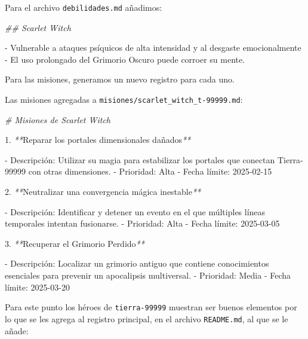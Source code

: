 \documentclass[
]{book}
\newenvironment{Shaded}{\begin{snugshade}}{\end{snugshade}}
\newcommand{\CommentTok}[1]{\textcolor[rgb]{0.56,0.35,0.01}{\textit{#1}}}
\newcommand{\ExtensionTok}[1]{#1}
\newcommand{\NormalTok}[1]{#1}
\newcommand{\PreprocessorTok}[1]{\textcolor[rgb]{0.56,0.35,0.01}{\textit{#1}}}
\begin{document}
Para el archivo \texttt{debilidades.md} añadimos:

\begin{Shaded}
\begin{Highlighting}[]

\CommentTok{\#\# Scarlet Witch}

\ExtensionTok{{-}}\NormalTok{ Vulnerable a ataques psíquicos de alta intensidad y al desgaste emocionalmente}
\ExtensionTok{{-}}\NormalTok{ El uso prolongado del Grimorio Oscuro puede corroer su mente.}
\end{Highlighting}
\end{Shaded}

Para las misiones, generamos un nuevo registro para cada uno.

Las misiones agregadas a \texttt{misiones/scarlet\_witch\_t-99999.md}:

\begin{Shaded}
\begin{Highlighting}[]
\CommentTok{\# Misiones de Scarlet Witch}

\ExtensionTok{1.} \PreprocessorTok{**}\NormalTok{Reparar los portales dimensionales dañados}\PreprocessorTok{**}

   \ExtensionTok{{-}}\NormalTok{ Descripción: Utilizar su magia para estabilizar los portales que conectan Tierra{-}99999 con otras dimensiones.}
   \ExtensionTok{{-}}\NormalTok{ Prioridad: Alta}
   \ExtensionTok{{-}}\NormalTok{ Fecha límite: 2025{-}02{-}15}

\ExtensionTok{2.} \PreprocessorTok{**}\NormalTok{Neutralizar una convergencia mágica inestable}\PreprocessorTok{**}

   \ExtensionTok{{-}}\NormalTok{ Descripción: Identificar y detener un evento en el que múltiples líneas temporales intentan fusionarse.}
   \ExtensionTok{{-}}\NormalTok{ Prioridad: Alta}
   \ExtensionTok{{-}}\NormalTok{ Fecha límite: 2025{-}03{-}05}

\ExtensionTok{3.} \PreprocessorTok{**}\NormalTok{Recuperar el Grimorio Perdido}\PreprocessorTok{**}

   \ExtensionTok{{-}}\NormalTok{ Descripción: Localizar un grimorio antiguo que contiene conocimientos esenciales para prevenir un apocalipsis multiversal.}
   \ExtensionTok{{-}}\NormalTok{ Prioridad: Media}
   \ExtensionTok{{-}}\NormalTok{ Fecha límite: 2025{-}03{-}20}
\end{Highlighting}
\end{Shaded}

Para este punto los héroes de \texttt{tierra-99999} muestran ser buenos elementos por lo que se les agrega al registro principal, en el archivo \texttt{README.md}, al que se le añade:
\end{document}
